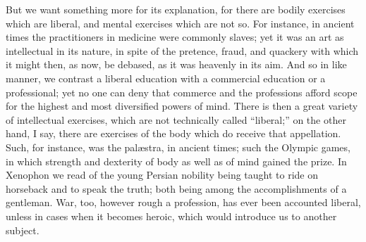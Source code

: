 But we want something more for its explanation, for there are
bodily exercises which are liberal, and mental exercises which are not
so. For instance, in ancient times the practitioners in medicine were
commonly slaves; yet it was an art as intellectual in its nature, in
spite of the pretence, fraud, and quackery with which it might then,
as now, be debased, as it was heavenly in its aim. And so in like
manner, we contrast a liberal education with a commercial education or
a professional; yet no one can deny that commerce and the professions
afford scope for the highest and most diversified powers of mind.
There is then a great variety of intellectual exercises, which are not
technically called ``liberal;'' on the other hand, I say,
there are exercises of the body which do receive that appellation.
Such, for instance, was the palæstra, in ancient times; such the
Olympic games, in which strength and dexterity of body as well as of
mind gained the prize. In Xenophon we read of the young Persian
nobility being taught to ride on horseback and to speak the truth;
both being among the accomplishments of a gentleman. War, too, however
rough a profession, has ever been accounted liberal, unless in cases
when it becomes heroic, which would introduce us to another subject.

